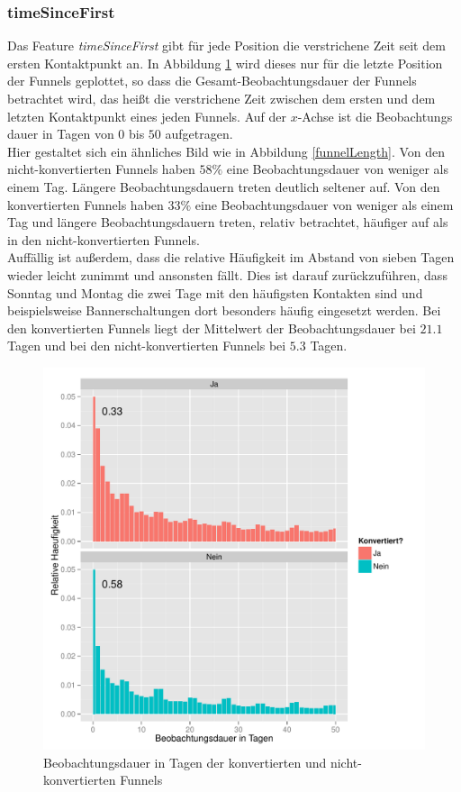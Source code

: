 \subsubsection*{timeSinceFirst}
Das Feature \textit{timeSinceFirst} gibt für jede Position die verstrichene Zeit seit dem ersten Kontaktpunkt an. In Abbildung \ref{timeSinceFirst} wird dieses nur für die letzte Position der Funnels geplottet, so dass die Gesamt-Beobachtungsdauer der Funnels betrachtet wird, das heißt die verstrichene Zeit zwischen dem ersten und dem letzten Kontaktpunkt eines jeden Funnels. Auf der $x$-Achse ist die Beobachtungs dauer in Tagen von $0$ bis $50$ aufgetragen.\\
Hier gestaltet sich ein ähnliches Bild wie in Abbildung \ref{funnelLength}. Von den nicht-konvertierten Funnels haben $58 \%$ eine Beobachtungsdauer von weniger als einem Tag. Längere Beobachtungsdauern treten deutlich seltener auf. Von den konvertierten Funnels haben $33 \%$ eine Beobachtungsdauer von weniger als einem Tag und längere Beobachtungsdauern treten, relativ betrachtet, häufiger auf als in den nicht-konvertierten Funnels.\\
Auffällig ist außerdem, dass die relative Häufigkeit im Abstand von sieben Tagen wieder leicht zunimmt und ansonsten fällt. Dies ist darauf zurückzuführen, dass Sonntag und Montag die zwei Tage mit den häufigsten Kontakten sind und beispielsweise Bannerschaltungen dort besonders häufig eingesetzt werden. Bei den konvertierten Funnels liegt der Mittelwert der Beobachtungsdauer bei $21.1$ Tagen und bei den nicht-konvertierten Funnels bei $5.3$ Tagen. 
\begin{figure}[H]
    \centering
    \includegraphics[scale=0.5]{timeSinceFirst_Last.pdf}
    \caption{Beobachtungsdauer in Tagen der konvertierten und nicht-konvertierten Funnels}
    \label{timeSinceFirst}
\end{figure}

